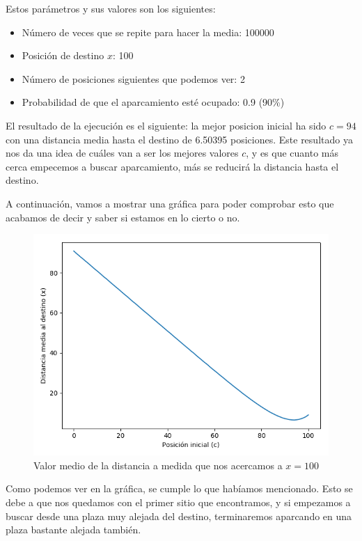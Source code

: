 \documentclass[11pt,a4paper]{report}
\begin{document}
Estos parámetros y sus valores son los siguientes:

\begin{itemize}
	\item Número de veces que se repite para hacer la media: 100000
	\item Posición de destino $x$: 100
	\item Número de posiciones siguientes que podemos ver: 2
	\item Probabilidad de que el aparcamiento esté ocupado: 0.9 (90\%)
\end{itemize}

El resultado de la ejecución es el siguiente: la mejor posicion inicial ha sido $c=94$ con una distancia media hasta
el destino de 6.50395 posiciones. Este resultado ya nos da una idea de cuáles van a ser los mejores valores $c$, y es que
cuanto más cerca empecemos a buscar aparcamiento, más se reducirá la distancia hasta el destino.

A continuación, vamos a mostrar una gráfica para poder comprobar esto que acabamos de decir y saber si estamos en lo
cierto o no.

\begin{figure}[H]
\centering
\includegraphics[scale=0.7]{img/x-100-2-90.png}
\caption{Valor medio de la distancia a medida que nos acercamos a $x=100$}
\end{figure}

Como podemos ver en la gráfica, se cumple lo que habíamos mencionado. Esto se debe a que nos quedamos con el primer
sitio que encontramos, y si empezamos a buscar desde una plaza muy alejada del destino, terminaremos aparcando en
una plaza bastante alejada también.
\end{document}
